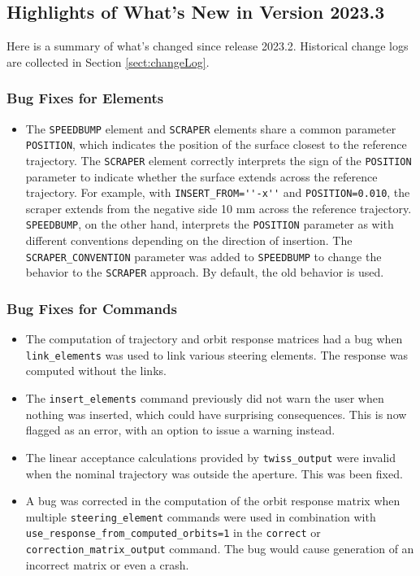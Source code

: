 \documentclass[11pt]{article}
\begin{document}
\subsection{Highlights of What's New in Version 2023.3}

Here is a summary of what's changed since release 2023.2.  Historical change logs are collected in Section
\ref{sect:changeLog}.

\subsubsection{Bug Fixes for Elements}

\begin{itemize}
\item The \verb|SPEEDBUMP| element and \verb|SCRAPER| elements share a common parameter \verb|POSITION|,
  which indicates the position of the surface closest to the reference trajectory. The \verb|SCRAPER|
  element  correctly interprets the sign of the \verb|POSITION| parameter to indicate whether the
  surface extends across the reference trajectory. For example, with \verb|INSERT_FROM=''-x''| and
  \verb|POSITION=0.010|, the scraper extends from the negative side 10 mm across the reference
  trajectory. \verb|SPEEDBUMP|, on the other hand, interprets the \verb|POSITION| parameter as
  with different conventions depending on the direction of insertion.
  The \verb|SCRAPER_CONVENTION| parameter was added to \verb|SPEEDBUMP| to change the
  behavior to the \verb|SCRAPER| approach. By default, the old behavior is used.
\end{itemize}

\subsubsection{Bug Fixes for Commands}
\begin{itemize}
\item The computation of trajectory and orbit response matrices had a bug when \verb|link_elements| was used
  to link various steering elements. The response was computed without the links.
\item The \verb|insert_elements| command previously did not warn the user when nothing was inserted, which
  could have surprising consequences. This is now flagged as an error, with an option to issue a warning instead.
\item The linear acceptance calculations provided by \verb|twiss_output| were invalid when the nominal trajectory
  was outside the aperture. This was been fixed.
\item A bug was corrected in the computation of the orbit response matrix when multiple
  \verb|steering_element| commands were used in combination with \verb|use_response_from_computed_orbits=1| in
  the \verb|correct| or \verb|correction_matrix_output| command. The bug would cause generation of an
  incorrect matrix or even a crash.
\end{itemize}
\end{document}
